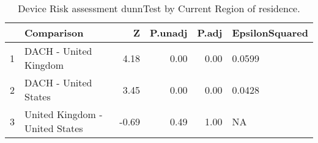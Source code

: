 \begin{table}[ht]
\centering
\begin{tabular}{rlrrrl}
  \hline
 & Comparison & Z & P.unadj & P.adj & EpsilonSquared \\ 
  \hline
1 & DACH - United Kingdom & 4.18 & 0.00 & 0.00 & 0.0599 \\ 
  2 & DACH - United States & 3.45 & 0.00 & 0.00 & 0.0428 \\ 
  3 & United Kingdom - United States & -0.69 & 0.49 & 1.00 & NA \\ 
   \hline
\end{tabular}
\caption{Device Risk assessment dunnTest by Current Region of residence.} 
\end{table}
